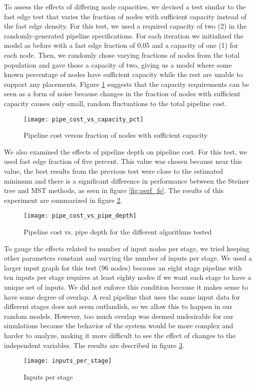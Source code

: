 \documentclass[conference]{IEEEtran}
\begin{document}
	To assess the effects of differing node capacities, we devised a test similar to the fast edge test that varies the fraction of nodes with sufficient capacity instead of the fast edge density. For this test, we used a required capacity of two (2) in the randomly-generated pipeline specifications. For each iteration we initialized the model as before with a fast edge fraction of 0.05 and a capacity of one (1) for each node. Then, we randomly chose varying fractions of nodes from the total population and gave those a capacity of two, giving us a model where some known percentage of nodes have sufficient capacity while the rest are unable to support any placements. Figure \ref{fig:perf_cap} suggests that the capacity requirements can be seen as a form of noise because changes in the fraction of nodes with sufficient capacity causes only small, random fluctuations to the total pipeline cost.
	\begin{figure}[t]
	    \centering
	    \texttt{[image: pipe\_cost\_vs\_capacity\_pct]}
	    \caption{Pipeline cost versus fraction of nodes with sufficient capacity}
	    \label{fig:perf_cap}
	\end{figure}
	
	We also examined the effects of pipeline depth on pipeline cost. For this test, we used fast edge fraction of five percent. This value was chosen because near this value, the best results from the previous test were close to the estimated minimum and there is a significant difference in performance between the Steiner tree and MST methods, as seen in figure \ref{fig:perf_fe}. The results of this experiment are summarized in figure \ref{fig:perf_depth}.
	\begin{figure}[t]
	    \centering
	    \texttt{[image: pipe\_cost\_vs\_pipe\_depth]}
	    \caption{Pipeline cost vs. pipe depth for the different algorithms tested}
	    \label{fig:perf_depth}
	\end{figure}
	 
	 To gauge the effects related to number of input nodes per stage, we tried keeping other parameters constant and varying the number of inputs per stage. We used a larger input graph for this test (96 nodes) because an eight stage pipeline with ten inputs per stage requires at least eighty nodes if we want each stage to have a unique set of inputs. We did not enforce this condition because it makes sense to have some degree of overlap. A real pipeline that uses the same input data for different stages does not seem outlandish, so we allow this to happen in our random models. However, too much overlap was deemed undesirable for our simulations because the behavior of the system would be more complex and harder to analyze, making it more difficult to see the effect of changes to the independent variables. The results are described in figure \ref{fig:perf_ips}.
	 \begin{figure}[t]
	     \centering
	     \texttt{[image: inputs\_per\_stage]}
	     \caption{Inputs per stage}
	     \label{fig:perf_ips}
	 \end{figure}
	 
\end{document}
